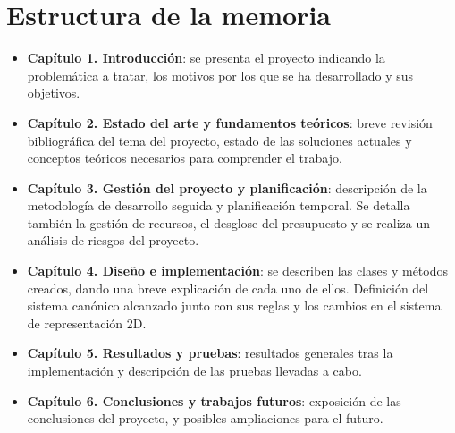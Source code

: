 \section{Estructura de la memoria}
\begin{itemize}
    \item \textbf{Capítulo 1. Introducción}: se presenta el proyecto indicando la problemática a tratar, los motivos por los que se ha desarrollado y sus objetivos. 
    \item \textbf{Capítulo 2. Estado del arte y fundamentos teóricos}: breve revisión bibliográfica del tema del proyecto, estado de las soluciones actuales y conceptos teóricos necesarios para comprender el trabajo.
    \item \textbf{Capítulo 3. Gestión del proyecto y planificación}: descripción de la metodología de desarrollo seguida y planificación temporal. Se detalla también la gestión de recursos, el desglose del presupuesto y se realiza un análisis de riesgos del proyecto.
    \item \textbf{Capítulo 4. Diseño e implementación}: se describen las clases y métodos creados, dando una breve explicación de cada uno de ellos. Definición del sistema canónico alcanzado junto con sus reglas y los cambios en el sistema de representación 2D. 
    \item \textbf{Capítulo 5. Resultados y pruebas}: resultados generales tras la implementación y descripción de las pruebas llevadas a cabo.
    \item \textbf{Capítulo 6. Conclusiones y trabajos futuros}: exposición de las conclusiones del proyecto, y posibles ampliaciones para el futuro.
\end{itemize}
